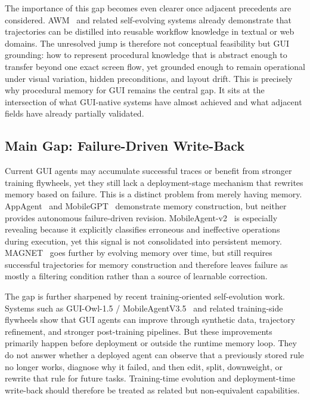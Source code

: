 \documentclass{article}
\begin{document}
The importance of this gap becomes even clearer once adjacent precedents
are considered. AWM~\parencite{wang2024awm} and related self-evolving
systems already demonstrate that trajectories can be distilled into
reusable workflow knowledge in textual or web domains. The unresolved
jump is therefore not conceptual feasibility but GUI grounding: how to
represent procedural knowledge that is abstract enough to transfer
beyond one exact screen flow, yet grounded enough to remain operational
under visual variation, hidden preconditions, and layout drift. This is
precisely why procedural memory for GUI remains the central gap. It sits
at the intersection of what GUI-native systems have almost achieved and
what adjacent fields have already partially validated.

\subsection{Main Gap: Failure-Driven
Write-Back}\label{62-main-gap-failure-driven-write-back}

Current GUI agents may accumulate successful traces or benefit from
stronger training flywheels, yet they still lack a deployment-stage
mechanism that rewrites memory based on failure. This is a distinct
problem from merely having memory. AppAgent~\parencite{zhang2023appagent}
and MobileGPT~\parencite{lee2024mobilegpt} demonstrate memory
construction,
but neither provides autonomous failure-driven revision.
MobileAgent-v2~\parencite{wang2024mobileagentv2} is especially
revealing because it explicitly classifies erroneous and ineffective
operations during execution, yet this signal is not consolidated into
persistent memory. MAGNET~\parencite{sun2026magnet} goes further by
evolving memory over time, but still requires successful trajectories
for memory construction and therefore leaves failure as mostly a
filtering condition rather than a source of learnable correction.

The gap is further sharpened by recent training-oriented self-evolution
work. Systems such as GUI-Owl-1.5 /
MobileAgentV3.5~\parencite{xu2026mobileagentv35} and related
training-side flywheels show that GUI agents can improve through
synthetic data, trajectory refinement, and stronger post-training
pipelines. But these improvements primarily happen before deployment or
outside the runtime memory loop. They do not answer whether a deployed
agent can observe that a previously stored rule no longer works,
diagnose why it failed, and then edit, split, downweight, or rewrite
that rule for future tasks. Training-time evolution and deployment-time
write-back should therefore be treated as related but non-equivalent
capabilities.
\end{document}
